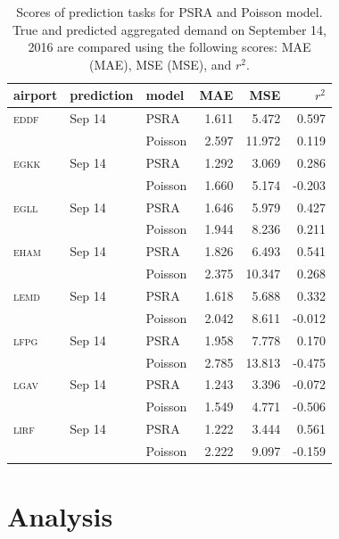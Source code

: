 \documentclass[]{elsarticle}
\newcommand{\airp}[1]{\textcolor{#1}{\textsc{#1}}}
\begin{document}
\begin{table}
  \centering
  \caption{Scores of prediction tasks for \acs{PSRA} and Poisson model. True and predicted aggregated demand on September 14, 2016 are compared using the following scores: \acl{MAE} (\acs{MAE}), \acl{MSE} (\acs{MSE}), and \(r^2\).}\label{tab:predictions_last_day}
  \begin{tabular}{lllrrr}
    \toprule
    airport    & prediction & model & \acs{MAE} & \acs{MSE} & \(r^2\)  \\
    \midrule
    \airp{eddf} & Sep 14    & \acs{PSRA} &  1.611 &   5.472 &  0.597 \\
         &                  & Poisson    &  2.597 &  11.972 &  0.119 \\
    \airp{egkk} & Sep 14    & \acs{PSRA} &  1.292 &   3.069 &  0.286 \\
         &                  & Poisson    &  1.660 &   5.174 & -0.203 \\
    \airp{egll} & Sep 14    & \acs{PSRA} &  1.646 &   5.979 &  0.427 \\
         &                  & Poisson    &  1.944 &   8.236 &  0.211 \\
    \airp{eham} & Sep 14    & \acs{PSRA} &  1.826 &   6.493 &  0.541 \\
         &                  & Poisson    &  2.375 &  10.347 &  0.268 \\
    \airp{lemd} & Sep 14    & \acs{PSRA} &  1.618 &   5.688 &  0.332 \\
         &                  & Poisson    &  2.042 &   8.611 & -0.012 \\
    \airp{lfpg} & Sep 14    & \acs{PSRA} &  1.958 &   7.778 &  0.170 \\
         &                  & Poisson    &  2.785 &  13.813 & -0.475 \\
    \airp{lgav} & Sep 14    & \acs{PSRA} &  1.243 &   3.396 & -0.072 \\
         &                  & Poisson    &  1.549 &   4.771 & -0.506 \\
    \airp{lirf} & Sep 14    & \acs{PSRA} &  1.222 &   3.444 &  0.561 \\
         &                  & Poisson    &  2.222 &   9.097 & -0.159 \\
    \bottomrule
  \end{tabular}
\end{table}

\section{Analysis}\label{sec:analysis}
\end{document}

